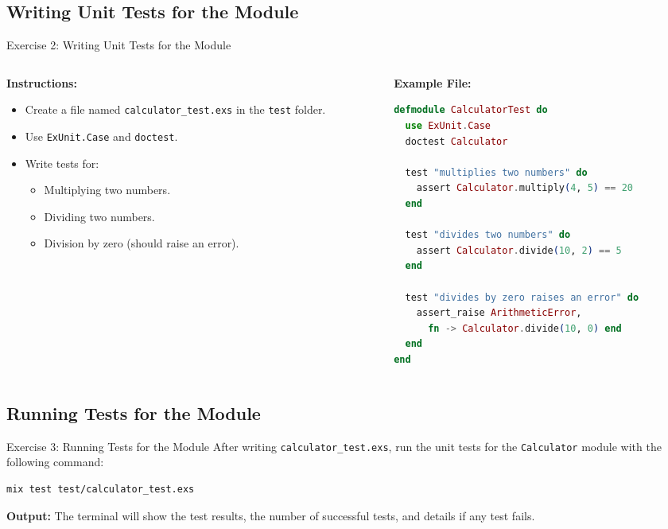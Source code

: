 \documentclass[aspectratio=169, table]{beamer}
\begin{document}
\subsection{Writing Unit Tests for the Module}
\begin{frame}[fragile]{Exercise 2: Writing Unit Tests for the Module}
\vspace{20pt}
\begin{columns}

\begin{column}[t]{0.42\textwidth}
\textbf{Instructions:}
\begin{itemize}
  \item Create a file named \texttt{calculator\_test.exs} in the \texttt{test} folder.  
  \item Use \texttt{ExUnit.Case} and \texttt{doctest}.  
  \item Write tests for:
    \begin{itemize}
      \item Multiplying two numbers.  
      \item Dividing two numbers.  
      \item Division by zero (should raise an error).  
    \end{itemize}
\end{itemize}
\end{column}

\begin{column}[t]{0.58\textwidth}
\textbf{Example File:}
\begin{lstlisting}[language=Elixir, basicstyle=\ttfamily\scriptsize]
defmodule CalculatorTest do
  use ExUnit.Case
  doctest Calculator

  test "multiplies two numbers" do
    assert Calculator.multiply(4, 5) == 20
  end

  test "divides two numbers" do
    assert Calculator.divide(10, 2) == 5
  end

  test "divides by zero raises an error" do
    assert_raise ArithmeticError,
      fn -> Calculator.divide(10, 0) end
  end
end
\end{lstlisting}
\end{column}

\end{columns}
\end{frame}

\subsection{Running Tests for the Module}
\begin{frame}[fragile]{Exercise 3: Running Tests for the Module}
\vspace{15pt}
After writing \texttt{calculator\_test.exs},  
run the unit tests for the \texttt{Calculator} module with the following command:

\begin{lstlisting}[language=bash]
mix test test/calculator_test.exs
\end{lstlisting}

\textbf{Output:} The terminal will show the test results,  
the number of successful tests, and details if any test fails.  
\end{frame}
\end{document}
